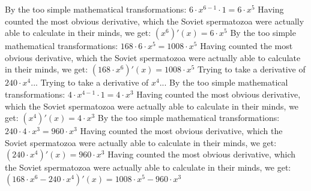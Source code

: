 \documentclass[a4paper, 12pt]{article}
\begin{document}
\newline
By the too simple mathematical transformations:
 ${{{6} \cdot {{x} ^ {{6} - {1}}}} \cdot {1}} = {{6} \cdot {{x} ^ {5}}}$ 
 \newline
 \newline 
Having counted the most obvious derivative, which the Soviet spermatozoa were actually able to calculate in their minds, we get:
$({{x} ^ {6}})'(x) = {{6} \cdot {{x} ^ {5}}}$\newline
\newline
By the too simple mathematical transformations:
 ${{168} \cdot {{6} \cdot {{x} ^ {5}}}} = {{1008} \cdot {{x} ^ {5}}}$ 
 \newline
 \newline 
Having counted the most obvious derivative, which the Soviet spermatozoa were actually able to calculate in their minds, we get:
$({{168} \cdot {{x} ^ {6}}})'(x) = {{1008} \cdot {{x} ^ {5}}}$\newline
\newline
Trying to take a derivative of ${{240} \cdot {{x} ^ {4}}}$...\newline
\newline
Trying to take a derivative of ${{x} ^ {4}}$...\newline
\newline
By the too simple mathematical transformations:
 ${{{4} \cdot {{x} ^ {{4} - {1}}}} \cdot {1}} = {{4} \cdot {{x} ^ {3}}}$ 
 \newline
 \newline 
Having counted the most obvious derivative, which the Soviet spermatozoa were actually able to calculate in their minds, we get:
$({{x} ^ {4}})'(x) = {{4} \cdot {{x} ^ {3}}}$\newline
\newline
By the too simple mathematical transformations:
 ${{240} \cdot {{4} \cdot {{x} ^ {3}}}} = {{960} \cdot {{x} ^ {3}}}$ 
 \newline
 \newline 
Having counted the most obvious derivative, which the Soviet spermatozoa were actually able to calculate in their minds, we get:
$({{240} \cdot {{x} ^ {4}}})'(x) = {{960} \cdot {{x} ^ {3}}}$\newline
\newline
Having counted the most obvious derivative, which the Soviet spermatozoa were actually able to calculate in their minds, we get:
$({{{168} \cdot {{x} ^ {6}}} - {{240} \cdot {{x} ^ {4}}}})'(x) = {{{1008} \cdot {{x} ^ {5}}} - {{960} \cdot {{x} ^ {3}}}}$\newline
\end{document}
